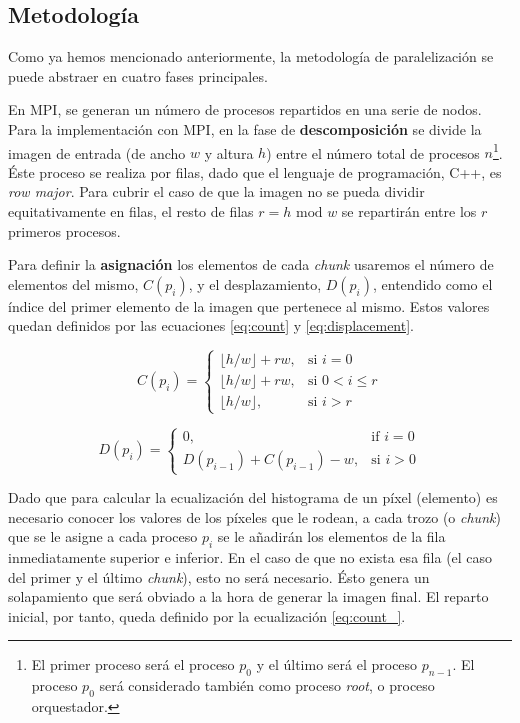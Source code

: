 \subsection{Metodología}

Como ya hemos mencionado anteriormente, la metodología de paralelización se puede abstraer en cuatro fases principales.

En MPI, se generan un número de procesos repartidos en una serie de nodos.
Para la implementación con MPI, en la fase de \textbf{descomposición} se divide la imagen de entrada (de ancho $w$ y altura $h$) entre el número total de procesos $n$\footnote{El primer proceso será el proceso $p_0$ y el último será el proceso $p_{n-1}$. El proceso $p_0$ será considerado también como proceso \textit{root}, o proceso orquestador.}. Éste proceso se realiza por filas, dado que el lenguaje de programación, C++, es \textit{row major}. Para cubrir el caso de que la imagen no se pueda dividir equitativamente en filas, el resto de filas $r = h \text{ mod } w$ se repartirán entre los $r$ primeros procesos.

Para definir la \textbf{asignación} los elementos de cada \textit{chunk} usaremos el número de elementos del mismo, $C(p_i)$, y el desplazamiento, $D(p_i)$, entendido como el índice del primer elemento de la imagen que pertenece al mismo.
Estos valores quedan definidos por las ecuaciones \ref{eq:count} y \ref{eq:displacement}.


\begin{equation}\label{eq:count}
  C(p_i) =
  \begin{cases}
    \lfloor h/w\rfloor + rw ,& \text{si } i = 0\\
    \lfloor h/w\rfloor + rw,& \text{si } 0 < i \le r\\
    \lfloor h/w\rfloor,& \text{si } i > r\
  \end{cases}
\end{equation}

\begin{equation}\label{eq:displacement}
  D(p_i) =
  \begin{cases}
    0,& \text{if } i = 0\\
    D(p_{i-1}) + C(p_{i-1}) - w,& \text{si } i > 0
  \end{cases}
\end{equation}


Dado que para calcular la ecualización del histograma de un píxel (elemento) es necesario conocer los valores de los píxeles que le rodean, a cada trozo (o \textit{chunk}) que se le asigne a cada proceso $p_i$ se le añadirán los elementos de la fila inmediatamente superior e inferior. En el caso de que no exista esa fila (el caso del primer y el último \textit{chunk}), esto no será necesario. Ésto genera un solapamiento que será obviado a la hora de generar la imagen final. El reparto inicial, por tanto, queda definido por la ecualización \ref{eq:count_}.

